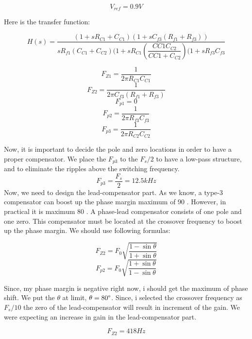 \begin{equation}
    V_{ref} = 0.9V
\end{equation}

Here is the transfer function:

\begin{equation}
    H(s) = \dfrac{(1+sR_{C1}+C_{C1})(1+sC_{f3}(R_{f1}+R_{f3}))}{sR_{f1}(C_{C1}+C_{C2})(1+sR_{C1}(\dfrac{C{C1}C_{C2}}{C{C1}+C_{C2}})(1+sR_{f3}C_{f3}}
\end{equation}

\begin{equation}
    F_{Z1} = \dfrac{1}{2\pi R_{C1}C_{C1}}
\end{equation}
\begin{equation}
     F_{Z2} = \dfrac{1}{2\pi C_{f3}(R_{f1}+R_{f3})}
\end{equation}
\begin{equation}
    F_{p1} = 0
\end{equation}
\begin{equation}
    F_{p2}   = \dfrac{1}{2\pi R_{f3}C_{f3}}
\end{equation}
\begin{equation}
    F_{p3}   = \dfrac{1}{2\pi R_{C2}C_{C2}}
\end{equation}

Now, it is important to decide the pole and zero locations in order to have a proper compensator. We place the $F_{p3}$ to the $F_s/2$ to have a low-pass structure, and to eliminate the ripples above the switching frequency. 
$$F_{p3} = \dfrac{F_s}{2} = 12.5kHz$$
Now, we need to design the lead-compensator part. As we know, a type-3 compensator can boost up the phase margin maximum of 90 \degree. However, in practical it is maximum 80 \degree. A phase-lead compensator consists of one pole and one zero. This compensator must be located at the crossover frequency to boost up the phase margin. We should use following formulas:

$$ F_{Z2} = F_0  \sqrt{\dfrac{1-\sin{\theta} }{{1+\sin{\theta}}}}$$
$$ F_{p2} = F_0  \sqrt{\dfrac{1+\sin{\theta} }{{1-\sin{\theta}}}}$$

Since, my phase margin is negative right now, i should get the maximum of phase shift. We put the $\theta$ at limit, $\theta = 80 \degree$. Since, i selected the crossover frequency as $F_s/10$ the zero of the lead-compensator will result in increment of the gain. We were expecting an increase in gain in the lead-compensator part.

$$ F_{Z2} = 418 Hz$$

